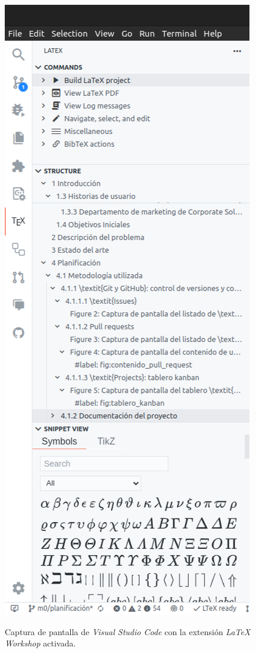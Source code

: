 \begin{figure}[H]
    \caption{Captura de pantalla de \textit{Visual Studio Code} con la extensión \textit{LaTeX Workshop} activada.}
    \centering
    \vspace*{0.5cm}
    \includegraphics[scale=0.2]{figuras/latex_workshop_extension.png}
    \label{fig:latex_workshop_extension}
\end{figure}


